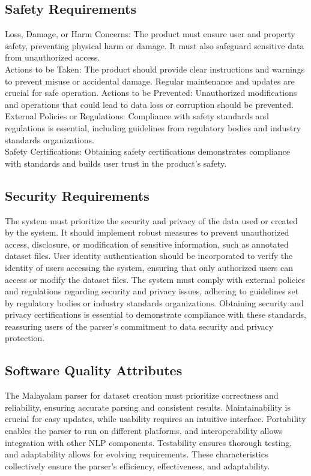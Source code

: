 \documentclass[12pt]{article}
\begin{document}
	\subsection{Safety Requirements}
	Loss, Damage, or Harm Concerns: The product must ensure user and property safety,
	preventing physical harm or damage. It must also safeguard sensitive data from
	unauthorized access.\\	
	Actions to be Taken: The product should provide clear instructions and warnings to prevent
	misuse or accidental damage. Regular maintenance and updates are crucial for safe
	operation.
	Actions to be Prevented: Unauthorized modifications and operations that could lead to
	data loss or corruption should be prevented.\\
	External Policies or Regulations: Compliance with safety standards and regulations is
	essential, including guidelines from regulatory bodies and industry standards
	organizations.\\
	Safety Certifications: Obtaining safety certifications demonstrates compliance with
	standards and builds user trust in the product's safety.
	
	\subsection{Security Requirements}
	The system must prioritize the security and privacy of the data used or created by the
	system. It should implement robust measures to prevent unauthorized access, disclosure,
	or modification of sensitive information, such as annotated dataset files. User identity
	authentication should be incorporated to verify the identity of users accessing the system,
	ensuring that only authorized users can access or modify the dataset files. The system
	must comply with external policies and regulations regarding security and privacy issues,
	adhering to guidelines set by regulatory bodies or industry standards organizations.
	Obtaining security and privacy certifications is essential to demonstrate compliance with
	these standards, reassuring users of the parser's commitment to data security and privacy
	protection.
	
	\subsection{Software Quality Attributes}
	The Malayalam parser for dataset creation must prioritize correctness and reliability,
	ensuring accurate parsing and consistent results. Maintainability is crucial for easy
	updates, while usability requires an intuitive interface. Portability enables the parser to run
	on different platforms, and interoperability allows integration with other NLP components.
	Testability ensures thorough testing, and adaptability allows for evolving requirements.
	These characteristics collectively ensure the parser's efficiency, effectiveness, and
	adaptability.
	
\end{document}
